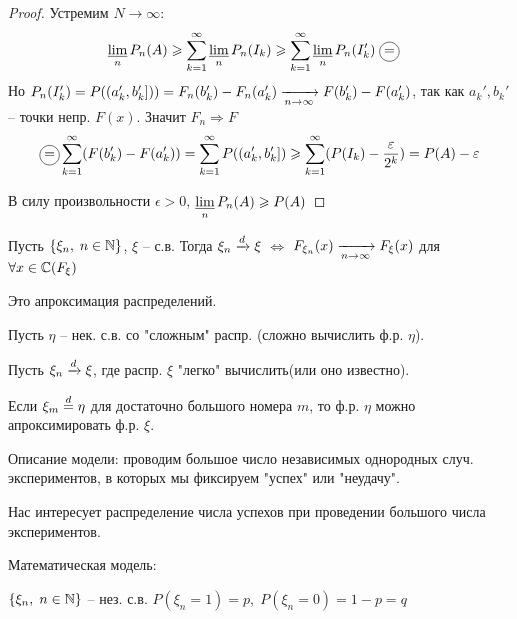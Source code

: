 \begin{theorem}
\begin{proof}
    Устремим $N \to \infty:$
    \begin{align*}
      &\limdown_n P_n(A) \geq \sum_{k = 1}^{\infty} \limdown_n P_n(I_k) 
      \geq \sum_{k = 1}^{\infty} \limdown_n P_n(I_k') \;
      \circled{=} 
    \end{align*}
    Но $P_n(I_k') = P((a_k', b_k'])) = F_n(b_k') - F_n(a_k')
    \xrightarrow[n \to \infty]{} F(b_k') - F(a_k')$, 
    так как $a_k', b_k'$ -- точки непр. $F(x)$. Значит $F_n \Rightarrow F$
    \begin{align*}
      \circled{=} \sum_{k = 1}^{\infty} (F(b_k') - F(a_k')) 
      = \sum_{k = 1}^{\infty} P((a_k', b_k']) 
      \geq \sum_{k = 1}^{\infty} (P(I_k) - \frac{\epsilon}{2^k}) = P(A) - \epsilon
    \end{align*}

    В силу произвольности $\epsilon > 0$, $\varliminf\limits_n P_n(A) \geqslant P(A)$

  \end{proof}

\end{theorem}

\begin{corollary}
  Пусть $\{ \xi_n,\; n \in \mathbb{N} \}$, $\xi$ -- с.в. 
  Тогда $\xi_n \xrightarrow{d} \xi$
  $\Leftrightarrow$ $F_{\xi_n}(x) \xrightarrow[n \to \infty]{} F_{\xi} (x)$ 
  для $\forall x \in \mathbb{C} (F_\xi)$\\
\end{corollary}

 
Это апроксимация распределений.

Пусть $\eta$ -- нек. с.в. со "сложным" распр. (сложно вычислить ф.р. $\eta$). 

Пусть $\xi_n \xrightarrow{d} \xi$, где распр. $\xi$ "легко" вычислить(или оно известно). 

Если $\xi_m \stackrel{d}{=} \eta$ для достаточно большого номера $m$, 
то ф.р. $\eta$ можно апроксимировать ф.р. $\xi$.\\


Описание модели: проводим большое число независимых однородных случ. экспериментов, в которых мы фиксируем "успех" или "неудачу".

Нас интересует распределение числа успехов при проведении большого числа экспериментов.

Математическая модель:

$\{ \xi_n,\; n \in \mathbb{N} \}$ -- нез. с.в.
$P(\xi_n = 1) = p,\; P(\xi_n = 0) = 1 - p = q$

